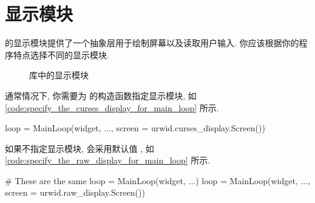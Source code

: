 \section{显示模块}
\indent\urwid{} 的显示模块提供了一个抽象层用于绘制屏幕以及读取用户输入. 你应该根据你的程序特点选择不同的显示模块.

\begin{figure}[!htb]
    \centering
    
    \caption{\urwid{} 库中的显示模块}
    \label{fig:display_models_of_urwid_library}
\end{figure}

通常情况下, 你需要为  的构造函数指定显示模块, 如\cref{code:specify_the_curses_display_for_main_loop} 所示.%
%
\begin{codebox}[
  caption = 为 \inlinepython{MainLoop} 指定显示模块 \inlinepython{urwid.curses_display.Screen()},
  label = code:specify_the_curses_display_for_main_loop
]
loop = MainLoop(widget, ..., screen = urwid.curses_display.Screen())
\end{codebox}%
%
如果不指定显示模块,  会采用默认值 , 如\cref{code:specify_the_raw_display_for_main_loop} 所示.%
%
\begin{codebox}[
  caption = 为 \inlinepython{MainLoop} 指定显示模块 \inlinepython{urwid.raw_display.Screen()},
  label = code:specify_the_raw_display_for_main_loop
]
# These are the same
loop = MainLoop(widget, ...)
loop = MainLoop(widget, ..., screen = urwid.raw_display.Screen())
\end{codebox}%

